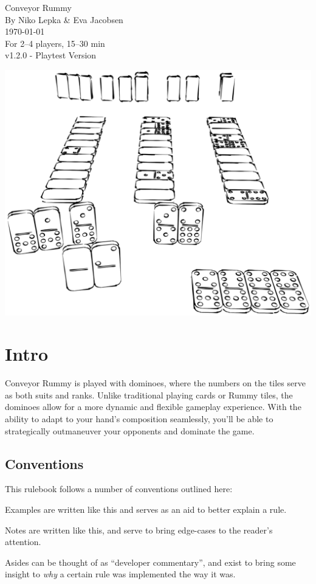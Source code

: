 


\begin{center}
  \huge Conveyor Rummy\\
  \Large By Niko Lepka \& Eva Jacobsen\\
  \normalsize \today\\
  \large For 2--4 players, 15--30 min\\
  \footnotesize v1.2.0 - Playtest Version
\end{center}

\noindent\includegraphics[width = \linewidth]{graphics/dominoes-gameplay.png}

\newpage
\section*{Intro}
Conveyor Rummy is played with dominoes, where the numbers on the tiles serve as both suits and ranks. 
Unlike traditional playing cards or Rummy tiles, the dominoes allow for a more dynamic and flexible gameplay experience. 
With the ability to adapt to your hand's composition seamlessly, you'll be able to strategically outmaneuver your opponents and dominate the game.

\subsection*{Conventions}
This rulebook follows a number of conventions outlined here:

\example Examples are written like this and serves as an aid to better explain a rule.

\note Notes are written like this, and serve to bring edge-cases to the reader's attention.

\aside Asides can be thought of as ``developer commentary'', and exist to bring some insight to \textit{why} a certain rule was implemented the way it was.
\newpage
\tableofcontents
\newpage







\newpage


